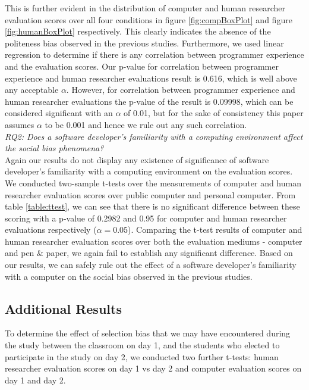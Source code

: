 \documentclass{sig-alternate-05-2015}
\begin{document}

This is further evident in the distribution of computer and human researcher evaluation scores over all four conditions in figure \ref{fig:compBoxPlot} and figure \ref{fig:humanBoxPlot} respectively. This clearly indicates the absence of the politeness bias observed in the previous studies. Furthermore, we used linear regression to determine if there is any correlation between programmer experience and the evaluation scores. Our p-value for correlation between programmer experience and human researcher evaluations result is 0.616, which is well above any acceptable $\alpha$. However, for correlation between programmer experience and human researcher evaluations the p-value of the result is 0.09998, which can be considered significant with an $\alpha$ of 0.01, but for the sake of consistency this paper assumes $\alpha$ to be 0.001 and hence we rule out any such correlation.\\

\textit{RQ2: Does a software developer's familiarity with a computing environment affect the social bias phenomena?}\\
Again our results do not display any existence of significance of software developer's familiarity with a computing environment on the evaluation scores. We conducted two-sample t-tests over the measurements of computer and human researcher evaluation scores over public computer and personal computer. From table \ref{table:ttest}, we can see that there is no significant difference between these scoring with a p-value of 0.2982 and 0.95 for computer and human researcher evaluations respectively ($\alpha=0.05$). Comparing the t-test results of computer and human researcher evaluation scores over both the evaluation mediums - computer and pen \& paper, we again fail to establish any significant difference. Based on our results, we can safely rule out the effect of a software developer's familiarity with a computer on the social bias observed in the previous studies.

\subsection{Additional Results}
To determine the effect of selection bias that we may have encountered during the study between the classroom on day 1, and the students who elected to participate in the study on day 2, we conducted two further t-tests: human researcher evaluation scores on day 1 vs day 2 and computer evaluation scores on day 1 and day 2.
\end{document}
